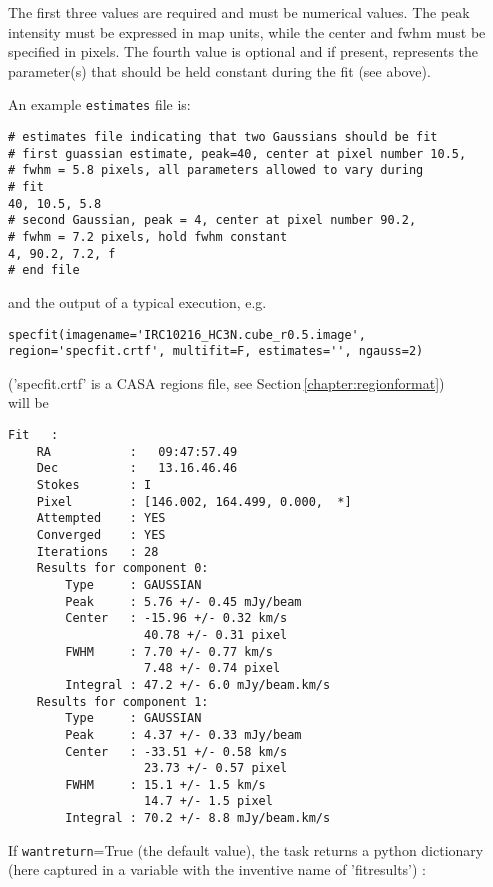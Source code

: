 The first three values are required and must be numerical values. The
peak intensity must be expressed in map units, while the
center and fwhm must be specified in pixels. The fourth value is
optional and if present, represents the parameter(s)
that should be held constant during the fit (see above).

An example {\tt estimates} file is: 

\small
\begin{verbatim}
# estimates file indicating that two Gaussians should be fit
# first guassian estimate, peak=40, center at pixel number 10.5, 
# fwhm = 5.8 pixels, all parameters allowed to vary during
# fit
40, 10.5, 5.8
# second Gaussian, peak = 4, center at pixel number 90.2, 
# fwhm = 7.2 pixels, hold fwhm constant
4, 90.2, 7.2, f
# end file
\end{verbatim}
\normalsize



and the output of a typical execution, e.g. 

\small
\begin{verbatim}
specfit(imagename='IRC10216_HC3N.cube_r0.5.image',
region='specfit.crtf', multifit=F, estimates='', ngauss=2)
\end{verbatim}
\normalsize
('specfit.crtf' is a CASA regions file, see
Section\,\ref{chapter:regionformat})\\

will be 


\small
\begin{verbatim}
Fit   :
    RA           :   09:47:57.49
    Dec          :   13.16.46.46
    Stokes       : I
    Pixel        : [146.002, 164.499, 0.000,  *]
    Attempted    : YES
    Converged    : YES
    Iterations   : 28
    Results for component 0:
        Type     : GAUSSIAN
        Peak     : 5.76 +/- 0.45 mJy/beam
        Center   : -15.96 +/- 0.32 km/s
                   40.78 +/- 0.31 pixel
        FWHM     : 7.70 +/- 0.77 km/s
                   7.48 +/- 0.74 pixel
        Integral : 47.2 +/- 6.0 mJy/beam.km/s
    Results for component 1:
        Type     : GAUSSIAN
        Peak     : 4.37 +/- 0.33 mJy/beam
        Center   : -33.51 +/- 0.58 km/s
                   23.73 +/- 0.57 pixel
        FWHM     : 15.1 +/- 1.5 km/s
                   14.7 +/- 1.5 pixel
        Integral : 70.2 +/- 8.8 mJy/beam.km/s
\end{verbatim}
\normalsize

If {\tt wantreturn}=True (the default value), the task
returns a python dictionary (here captured in a variable
with the inventive name of 'fitresults') : 

